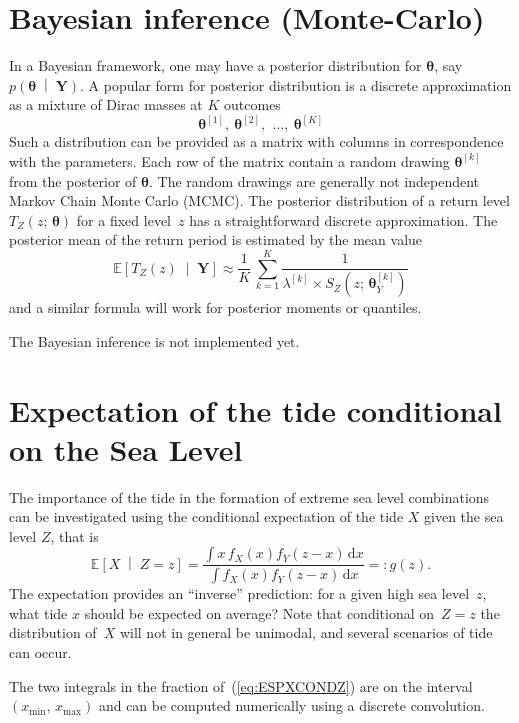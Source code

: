 \documentclass[11pt,a4paper]{report}\usepackage[]{graphicx}\usepackage[]{color}
\newcommand{\Esp}{\mathbb{E}}
\newcommand{\m}{\mathbf}
\newcommand{\bs}{\boldsymbol}
\newcommand{\pCond}[2]{\left( #1 \;\middle\vert\; #2 \right)}
\newcommand{\bCond}[2]{\left[ #1 \;\middle\vert\; #2 \right]}
\newcommand{\Low}[1]{#1_{\mathrm{min}}}
\newcommand{\Up}[1]{#1_{\mathrm{max}}}
\newenvironment{Prov}
   {\medskip \par \noindent%
    \sf \color{blue} }%
  {\medskip \par}
\begin{document}
\section{Bayesian inference (Monte-Carlo)}
In a Bayesian framework, one may have a posterior distribution for
$\bs{\theta}$, say $p\pCond{\bs{\theta}}{\m{Y}}$. A popular form for
posterior distribution is a discrete approximation as a mixture 
of Dirac masses at $K$ outcomes
$$
   \bs{\theta}^{[1]}, \: \bs{\theta}^{[2]}, \,
   \: \dots, \: \bs{\theta}^{[K]}
$$
Such a distribution can be provided as a matrix with columns in
correspondence with the parameters.  Each row of the matrix contain a
random drawing $\bs{\theta}^{[k]}$ from the posterior of $\bs{\theta}$.
The random drawings are generally not independent Markov Chain Monte
Carlo (MCMC).  The posterior distribution of a return level
$T_Z(z;\,\bs{\theta})$ for a fixed level~$z$ has a straightforward 
discrete approximation. The posterior mean of the return period is estimated
by the mean value
$$
   \Esp\bCond{T_Z(z)}{\m{Y}} \approx
    \frac{1}{K}\,\sum_{k=1}^{K} \frac{1}{\lambda^{[k]} \times S_Z(z;\,\bs{\theta}_Y^{[k]})}
$$
and a similar formula will work for posterior moments or quantiles.

\begin{Prov}
The Bayesian inference is not implemented yet.
\end{Prov}

\section{Expectation of the tide conditional on the Sea Level}
\label{TIDECONDSL}
The importance of the tide in the formation of extreme sea level
combinations can be investigated using the conditional expectation of
the tide $X$ given the sea level $Z$, that is
\begin{equation}
  \label{eq:ESPXCONDZ}
  \Esp\bCond{X}{Z=z} = \frac{\int x \,f_X(x)f_Y(z-x) \,\mathrm{d}x}%
    {\int f_X(x)f_Y(z-x) \,\mathrm{d}x} =: g(z).
\end{equation}
The expectation provides an ``inverse'' prediction: for a given high
sea level~$z$, what tide $x$ should be expected on average? Note that conditional
on~$Z=z$ the distribution of~$X$ will not in general be unimodal, and
several scenarios of tide can occur. 

The two integrals in the fraction of~(\ref{eq:ESPXCONDZ}) are on the interval
$(\Low{x},\,\Up{x})$ and can be computed
numerically using a discrete convolution. 
\end{document}
